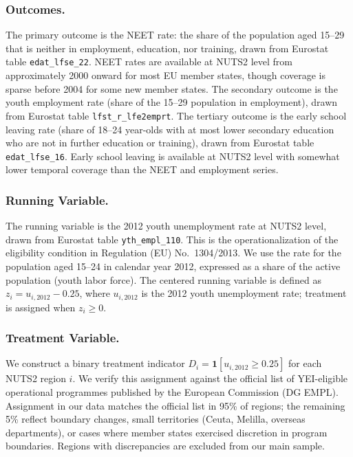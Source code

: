 \documentclass[12pt]{article}
\begin{document}
\subsubsection*{Outcomes.} The primary outcome is the NEET rate: the share of the population aged 15--29 that is neither in employment, education, nor training, drawn from Eurostat table \texttt{edat\_lfse\_22}. NEET rates are available at NUTS2 level from approximately 2000 onward for most EU member states, though coverage is sparse before 2004 for some new member states. The secondary outcome is the youth employment rate (share of the 15--29 population in employment), drawn from Eurostat table \texttt{lfst\_r\_lfe2emprt}. The tertiary outcome is the early school leaving rate (share of 18--24 year-olds with at most lower secondary education who are not in further education or training), drawn from Eurostat table \texttt{edat\_lfse\_16}. Early school leaving is available at NUTS2 level with somewhat lower temporal coverage than the NEET and employment series.

\subsubsection*{Running Variable.} The running variable is the 2012 youth unemployment rate at NUTS2 level, drawn from Eurostat table \texttt{yth\_empl\_110}. This is the operationalization of the eligibility condition in Regulation (EU) No.~1304/2013. We use the rate for the population aged 15--24 in calendar year 2012, expressed as a share of the active population (youth labor force). The centered running variable is defined as $z_i = u_{i,2012} - 0.25$, where $u_{i,2012}$ is the 2012 youth unemployment rate; treatment is assigned when $z_i \geq 0$.

\subsubsection*{Treatment Variable.} We construct a binary treatment indicator $D_i = \mathbf{1}[u_{i,2012} \geq 0.25]$ for each NUTS2 region $i$. We verify this assignment against the official list of YEI-eligible operational programmes published by the European Commission (DG EMPL). Assignment in our data matches the official list in 95\% of regions; the remaining 5\% reflect boundary changes, small territories (Ceuta, Melilla, overseas departments), or cases where member states exercised discretion in program boundaries. Regions with discrepancies are excluded from our main sample.
\end{document}
